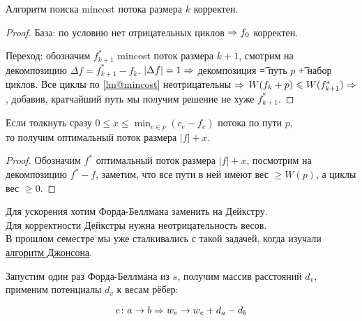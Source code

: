 \begin{Thm}
Алгоритм поиска mincost потока размера $k$ корректен.
\end{Thm}
\begin{proof}
База: по условию нет отрицательных циклов $\Rightarrow f_0$ корректен.

Переход: обозначим $f^{*}_{k+1}$ mincost поток размера $k{+}1$, смотрим на декомпозицию $\Delta f = f^{*}_{k+1} - f_k$.
$|\Delta f| = 1 \Rightarrow$ декомпозиция \t{=} путь $p$ \t{+} набор циклов. Все циклы по \autoref{lm@mincost} неотрицательны $\Rightarrow$
$W(f_k + p) \leqslant W(f^{*}_{k+1}) \Rightarrow$, добавив, кратчайший путь мы получим решение не хуже $f^{*}_{k+1}$.
\end{proof}

\begin{Lm}
Если толкнуть сразу $0 \le x \le \min_{e \in p}(c_e - f_e)$ потока по пути $p$, \\
то получим оптимальный поток размера $|f|+x$.
\end{Lm}
\begin{proof}
Обозначим $f^{*}$ оптимальный поток размера $|f|+x$, посмотрим на декомпозицию $f^{*} - f$, заметим, что все пути в ней имеют вес $\ge W(p)$, а циклы вес $\ge 0$.
\end{proof}


\pagebreak
\vspace*{-1.5em}

Для ускорения хотим Форда-Беллмана заменить на Дейкстру. \\
Для корректности Дейкстры нужна неотрицательность весов.\\
В прошлом семестре мы уже сталкивались с такой задачей, когда изучали \href{https://neerc.ifmo.ru/wiki/index.php?title=%D0%90%D0%BB%D0%B3%D0%BE%D1%80%D0%B8%D1%82%D0%BC_%D0%94%D0%B6%D0%BE%D0%BD%D1%81%D0%BE%D0%BD%D0%B0}{алгоритм Джонсона}.


Запустим один раз Форда-Беллмана из $s$, получим массив расстояний $d_v$, 
применим потенциалы $d_v$ к весам рёбер:

\vspace*{-1em}
\begin{smallformula}
$$e \colon a \to b \Rightarrow w_e \rightarrow w_e + d_a - d_b$$
\end{smallformula}

